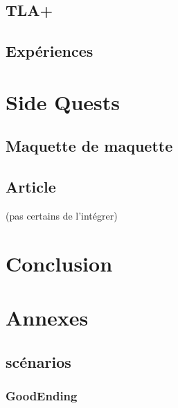 \documentclass[oneside, a4paper, 11pt]{book}
\begin{document}
\section{TLA+}
\label{sec:tla}
\section{Expériences}
\label{sec:experiences}



\chapter{Side Quests}
\label{sec:sidequests}

\section{Maquette de maquette}
\section{Article}
(pas certains de l'intégrer)




\chapter{Conclusion}



\appendix

\chapter{Annexes}
\section{scénarios}
\subsection{GoodEnding}
\label{scenar:goodEnding}

\backmatter
%
%
\printindex
\end{document}
